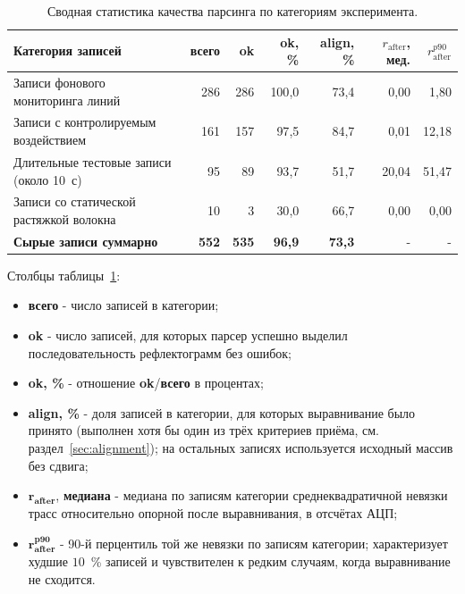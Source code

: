 \documentclass[12pt,a4paper]{extarticle}
\begin{document}
\begin{table}[h]
\caption{Сводная статистика качества парсинга по категориям эксперимента.}
\label{tab:parser_summary}
\centering
\renewcommand{\arraystretch}{1.15}
\begin{tabular}{p{5.6cm} r r r r r r}
\toprule
\textbf{Категория записей} & \textbf{всего} & \textbf{ok} & \textbf{ok, \%} & \textbf{align, \%} & \textbf{$r_\text{after}$, мед.} & \textbf{$r_\text{after}^{p90}$} \\
\midrule
Записи фонового мониторинга линий & 286 & 286 & 100{,}0 & 73{,}4 & 0{,}00 & 1{,}80 \\
Записи с контролируемым воздействием & 161 & 157 & 97{,}5 & 84{,}7 & 0{,}01 & 12{,}18 \\
Длительные тестовые записи (около 10~с) & 95 & 89 & 93{,}7 & 51{,}7 & 20{,}04 & 51{,}47 \\
Записи со статической растяжкой волокна & 10 & 3 & 30{,}0 & 66{,}7 & 0{,}00 & 0{,}00 \\
\midrule
\textbf{Сырые записи суммарно} & \textbf{552} & \textbf{535} & \textbf{96{,}9} & \textbf{73{,}3} & - & - \\
\bottomrule
\end{tabular}
\end{table}

\noindent
Столбцы таблицы~\ref{tab:parser_summary}:
\begin{itemize}[leftmargin=2em, itemsep=2pt, topsep=2pt]
  \item \textbf{всего} - число записей в категории;
  \item \textbf{ok} - число записей, для которых парсер успешно выделил последовательность рефлектограмм без ошибок;
  \item \textbf{ok, \%} - отношение \textbf{ok}/\textbf{всего} в процентах;
  \item \textbf{align, \%} - доля записей в категории, для которых выравнивание было принято (выполнен хотя бы один из трёх критериев приёма, см. раздел~\ref{sec:alignment}); на остальных записях используется исходный массив без сдвига;
  \item $\mathbf{r_\text{after}}$, \textbf{медиана} - медиана по записям категории среднеквадратичной невязки трасс относительно опорной после выравнивания, в отсчётах АЦП;
  \item $\mathbf{r_\text{after}^{p90}}$ - 90-й перцентиль той же невязки по записям категории; характеризует худшие $10$~\% записей и чувствителен к редким случаям, когда выравнивание не сходится.
\end{itemize}
\end{document}
